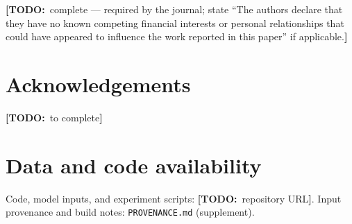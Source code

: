 \documentclass[a4paper,fleqn]{cas-sc}
\newcommand{\todo}[1]{\textcolor{BrickRed}{\textbf{[TODO:}~#1\textbf{]}}}
\begin{document}
\todo{complete --- required by the journal; state ``The authors declare that they have no
known competing financial interests or personal relationships that could have appeared to
influence the work reported in this paper'' if applicable.}

\section*{Acknowledgements}

\todo{to complete}

\section*{Data and code availability}

Code, model inputs, and experiment scripts: \todo{repository URL}. Input provenance and
build notes: \texttt{PROVENANCE.md} (supplement).


\printcredits



\end{document}
